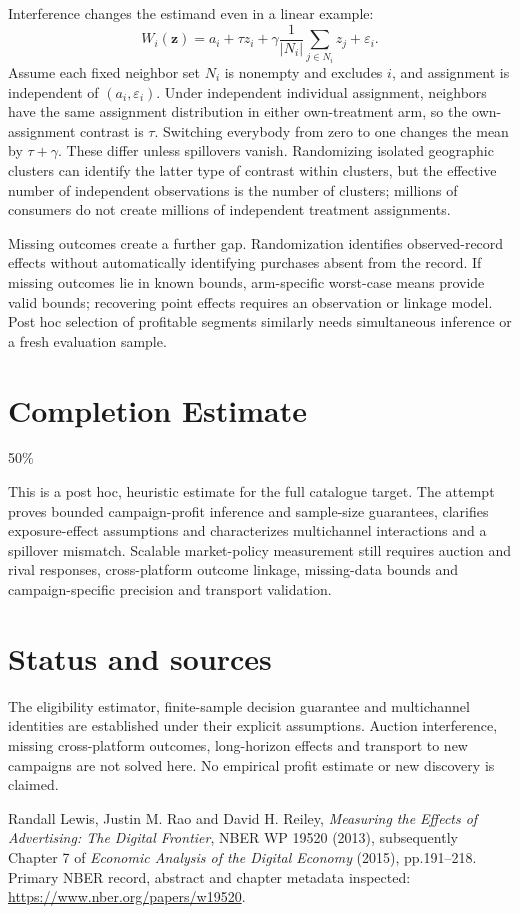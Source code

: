 \documentclass[11pt]{article}
\begin{document}
Interference changes the estimand even in a linear example:
\[
 W_i(\mathbf z)=a_i+\tau z_i+
   \gamma\frac1{|N_i|}\sum_{j\in N_i}z_j+\varepsilon_i.
\]
Assume each fixed neighbor set $N_i$ is nonempty and excludes $i$, and assignment is independent of $(a_i,\varepsilon_i)$. Under independent individual assignment, neighbors have the same assignment distribution in either own-treatment arm, so the own-assignment contrast is $\tau$. Switching everybody from zero to one changes the mean by $\tau+\gamma$. These differ unless spillovers vanish. Randomizing isolated geographic clusters can identify the latter type of contrast within clusters, but the effective number of independent observations is the number of clusters; millions of consumers do not create millions of independent treatment assignments.

Missing outcomes create a further gap. Randomization identifies observed-record effects without automatically identifying purchases absent from the record. If missing outcomes lie in known bounds, arm-specific worst-case means provide valid bounds; recovering point effects requires an observation or linkage model. Post hoc selection of profitable segments similarly needs simultaneous inference or a fresh evaluation sample.

\section{Completion Estimate}
50\%

This is a post hoc, heuristic estimate for the full catalogue target.
The attempt proves bounded campaign-profit inference and sample-size guarantees, clarifies exposure-effect assumptions and characterizes multichannel interactions and a spillover mismatch. Scalable market-policy measurement still requires auction and rival responses, cross-platform outcome linkage, missing-data bounds and campaign-specific precision and transport validation.

\section{Status and sources}
The eligibility estimator, finite-sample decision guarantee and multichannel identities are established under their explicit assumptions. Auction interference, missing cross-platform outcomes, long-horizon effects and transport to new campaigns are not solved here. No empirical profit estimate or new discovery is claimed.

Randall Lewis, Justin M. Rao and David H. Reiley, \emph{Measuring the Effects of Advertising: The Digital Frontier}, NBER WP 19520 (2013), subsequently Chapter 7 of \emph{Economic Analysis of the Digital Economy} (2015), pp.191--218. Primary NBER record, abstract and chapter metadata inspected:
\url{https://www.nber.org/papers/w19520}.
\end{document}
